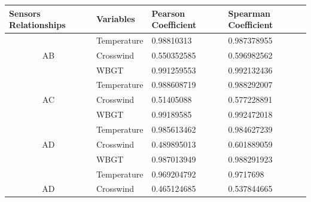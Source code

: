 \documentclass[a4paper,12pt]{article}
\begin{document}
   \begin{table}[]
 	\centering
 	\begin{tabular}{llll}
 		\hline
 		\multicolumn{1}{|l|}{Sensors Relationships} & \multicolumn{1}{l|}{Variables}   & \multicolumn{1}{l|}{Pearson Coefficient} & \multicolumn{1}{l|}{Spearman Coefficient} \\ \hline
 		\multicolumn{1}{|c|}{}                      & \multicolumn{1}{l|}{Temperature} & \multicolumn{1}{l|}{0.98810313}          & \multicolumn{1}{l|}{0.987378955}          \\ \hline
 		\multicolumn{1}{|c|}{AB}                    & \multicolumn{1}{l|}{Crosswind}   & \multicolumn{1}{l|}{0.550352585}         & \multicolumn{1}{l|}{0.596982562}          \\ \hline
 		\multicolumn{1}{|l|}{}                      & \multicolumn{1}{l|}{WBGT}        & \multicolumn{1}{l|}{0.991259553}         & \multicolumn{1}{l|}{0.992132436}          \\ \hline
 		& Temperature                      & 0.988608719                              & 0.988292007                               \\
 		\multicolumn{1}{c}{AC}                      & Crosswind                        & 0.51405088                               & 0.577228891                               \\
 		& WBGT                             & 0.99189585                               & 0.992472018                               \\ \hline
 		\multicolumn{1}{|l|}{}                      & \multicolumn{1}{l|}{Temperature} & \multicolumn{1}{l|}{0.985613462}         & \multicolumn{1}{l|}{0.984627239}          \\ \hline
 		\multicolumn{1}{|c|}{AD}                    & \multicolumn{1}{l|}{Crosswind}   & \multicolumn{1}{l|}{0.489895013}         & \multicolumn{1}{l|}{0.601889059}          \\ \hline
 		\multicolumn{1}{|l|}{}                      & \multicolumn{1}{l|}{WBGT}        & \multicolumn{1}{l|}{0.987013949}         & \multicolumn{1}{l|}{0.988291923}          \\ \hline
 		& Temperature                      & 0.969204792                              & 0.9717698                                 \\
 		\multicolumn{1}{c}{AD}                      & Crosswind                        & 0.465124685                              & 0.537844665                               \\

\end{tabular}
\end{table}
\end{document}

